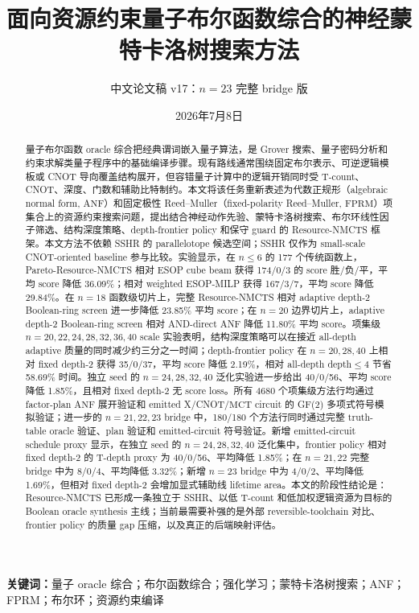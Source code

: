 \documentclass[UTF8,fontset=macnew,11pt]{ctexart}
\title{面向资源约束量子布尔函数综合的神经蒙特卡洛树搜索方法}
\author{中文论文稿 v17：$n=23$ 完整 bridge 版}
\date{2026年7月8日}
\newcommand{\method}{Resource-NMCTS}
\newcommand{\screen}{Boolean-ring screen}
\newcommand{\anf}{\ensuremath{\mathrm{ANF}}}
\newcommand{\fprm}{\ensuremath{\mathrm{FPRM}}}
\newcommand{\ttable}{truth-table}
\newcommand{\mct}{\ensuremath{\mathrm{MCT}}}
\begin{document}
\pagestyle{plain}
\maketitle

\begin{abstract}
量子布尔函数 oracle 综合把经典谓词嵌入量子算法，是 Grover 搜索、量子密码分析和约束求解类量子程序中的基础编译步骤。现有路线通常围绕固定布尔表示、可逆逻辑模板或 CNOT 导向覆盖结构展开，但容错量子计算中的逻辑开销同时受 T-count、CNOT、深度、门数和辅助比特制约。本文将该任务重新表述为代数正规形（algebraic normal form, \anf{}）和固定极性 Reed--Muller（fixed-polarity Reed--Muller, \fprm{}）项集合上的资源约束搜索问题，提出结合神经动作先验、蒙特卡洛树搜索、布尔环线性因子筛选、结构深度策略、depth-frontier policy 和保守 guard 的 \method{} 框架。本文方法不依赖 SSHR 的 parallelotope 候选空间；SSHR 仅作为 small-scale CNOT-oriented baseline 参与比较。实验显示，在 $n\leq6$ 的 177 个传统函数上，Pareto-\method{} 相对 ESOP cube beam 获得 174/0/3 的 score 胜/负/平，平均 score 降低 36.09\%；相对 weighted ESOP-MILP 获得 167/3/7，平均 score 降低 29.84\%。在 $n=18$ 函数级切片上，完整 \method{} 相对 adaptive depth-2 \screen{} 进一步降低 23.85\% 平均 score；在 $n=20$ 边界切片上，adaptive depth-2 \screen{} 相对 AND-direct ANF 降低 11.80\% 平均 score。项集级 $n=20,22,24,28,32,36,40$ scale 实验表明，结构深度策略可以在接近 all-depth adaptive 质量的同时减少约三分之一时间；depth-frontier policy 在 $n=20,28,40$ 上相对 fixed depth-2 获得 35/0/37，平均 score 降低 2.19\%，相对 all-depth depth$\leq4$ 节省 58.69\% 时间。独立 seed 的 $n=24,28,32,40$ 泛化实验进一步给出 40/0/56、平均 score 降低 1.85\%，且相对 fixed depth-2 无 score loss。所有 4680 个项集级方法行均通过 factor-plan \anf{} 展开验证和 emitted X/CNOT/\mct{} circuit 的 GF(2) 多项式符号模拟验证；进一步的 $n=21,22,23$ bridge 中，180/180 个方法行同时通过完整 \ttable{} oracle 验证、plan 验证和 emitted-circuit 符号验证。新增 emitted-circuit schedule proxy 显示，在独立 seed 的 $n=24,28,32,40$ 泛化集中，frontier policy 相对 fixed depth-2 的 T-depth proxy 为 40/0/56、平均降低 1.85\%；在 $n=21,22$ 完整 bridge 中为 8/0/4、平均降低 3.32\%；新增 $n=23$ bridge 中为 4/0/2、平均降低 1.69\%，但相对 fixed depth-2 会增加显式辅助线 lifetime area。本文的阶段性结论是：\method{} 已形成一条独立于 SSHR、以低 T-count 和低加权逻辑资源为目标的 Boolean oracle synthesis 主线；当前最需要补强的是外部 reversible-toolchain 对比、frontier policy 的质量 gap 压缩，以及真正的后端映射评估。
\end{abstract}

\noindent\textbf{关键词：}量子 oracle 综合；布尔函数综合；强化学习；蒙特卡洛树搜索；ANF；FPRM；布尔环；资源约束编译
\end{document}
